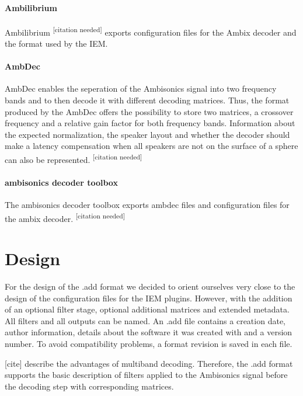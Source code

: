 \documentclass[a4paper, 10pt, twocolumn]{article}
\newcommand{\citationneeded}[1][]{\textsuperscript{\color{black} [citation needed]}}
\begin{document}
\paragraph{Ambilibrium}

Ambilibrium \citationneeded{} exports configuration files for the Ambix decoder and the format used by the IEM.

\paragraph{AmbDec}

AmbDec enables the seperation of the Ambisonics signal into two frequency bands and to then decode it with different decoding matrices. Thus, the format produced by the AmbDec offers the possibility to store two matrices, a crossover frequency and a relative gain factor for both frequency bands. Information about the expected normalization, the speaker layout and whether the decoder should make a latency compensation when all speakers are not on the surface of a sphere can also be represented.\citationneeded{}

\paragraph{ambisonics decoder toolbox}

The ambisonics decoder toolbox exports ambdec files and configuration files for the ambix decoder.\citationneeded{}


\section{Design} \label{sec:Design}

For the design of the .add format we decided to orient ourselves very close to the design of the configuration files for the IEM plugins. However, with the addition of an optional filter stage, optional additional matrices and extended metadata. All filters and all outputs can be named. An .add file contains a creation date, author information, details about the software it was created with and a version number. To avoid compatibility problems, a format revision is saved in each file. 

[cite] describe the advantages of multiband decoding. Therefore, the .add format supports the basic description of filters applied to the Ambisonics signal before the decoding step with corresponding matrices.
\end{document}
